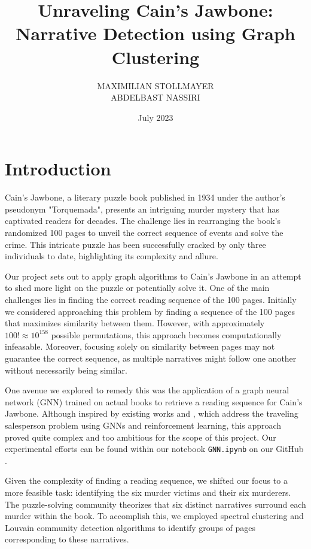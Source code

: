 \documentclass[a4paper]{article}
\title{Unraveling Cain's Jawbone: Narrative Detection using Graph Clustering}
\author{MAXIMILIAN STOLLMAYER \\ 
ABDELBAST NASSIRI}
\date{July 2023}
\begin{document}
\maketitle

\section{Introduction}

Cain's Jawbone, a literary puzzle book published in 1934 under the author's pseudonym "Torquemada", presents an intriguing murder mystery that has captivated readers for decades. The challenge lies in rearranging the book's randomized 100 pages to unveil the correct sequence of events and solve the crime. This intricate puzzle has been successfully cracked by only three individuals to date, highlighting its complexity and allure.

Our project sets out to apply graph algorithms to Cain's Jawbone in an attempt to shed more light on the puzzle or potentially solve it. One of the main challenges lies in finding the correct reading sequence of the 100 pages. Initially we considered approaching this problem by finding a sequence of the 100 pages that maximizes similarity between them. However, with approximately $100! \approx 10^{158}$ possible permutations, this approach becomes computationally infeasable. Moreover, focusing solely on similarity between pages may not guarantee the correct sequence, as multiple narratives might follow one another without necessarily being similar.

One avenue we explored to remedy this was the application of a graph neural network (GNN) trained on actual books to retrieve a reading sequence for Cain's Jawbone. Although inspired by existing works \cite{GNN1} and \cite{GNN2}, which address the traveling salesperson problem using GNNs and reinforcement learning, this approach proved quite complex and too ambitious for the scope of this project. Our experimental efforts can be found within our notebook \verb|GNN.ipynb| on our GitHub \cite{github}.

Given the complexity of finding a reading sequence, we shifted our focus to a more feasible task: identifying the six murder victims and their six murderers. The puzzle-solving community theorizes that six distinct narratives surround each murder within the book. To accomplish this, we employed spectral clustering and Louvain community detection algorithms to identify groups of pages corresponding to these narratives.
\end{document}
